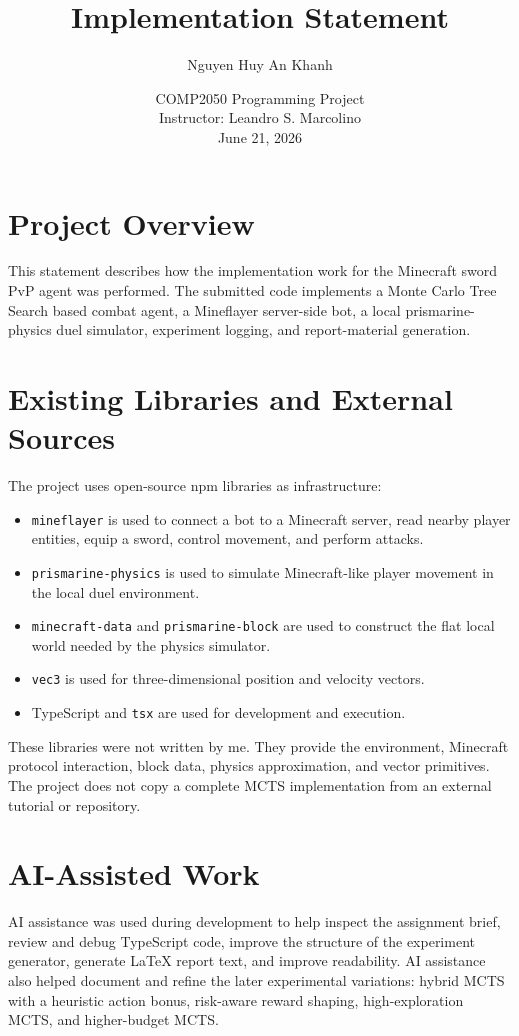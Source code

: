 \documentclass[11pt]{article}
\title{Implementation Statement}
\author{Nguyen Huy An Khanh}
\date{COMP2050 Programming Project\\Instructor: Leandro S. Marcolino\\June 21, 2026}
\begin{document}
\maketitle

\section*{Project Overview}

This statement describes how the implementation work for the Minecraft sword PvP agent was performed. The submitted code implements a Monte Carlo Tree Search based combat agent, a Mineflayer server-side bot, a local prismarine-physics duel simulator, experiment logging, and report-material generation.

\section*{Existing Libraries and External Sources}

The project uses open-source npm libraries as infrastructure:
\begin{itemize}
  \item \texttt{mineflayer} is used to connect a bot to a Minecraft server, read nearby player entities, equip a sword, control movement, and perform attacks.
  \item \texttt{prismarine-physics} is used to simulate Minecraft-like player movement in the local duel environment.
  \item \texttt{minecraft-data} and \texttt{prismarine-block} are used to construct the flat local world needed by the physics simulator.
  \item \texttt{vec3} is used for three-dimensional position and velocity vectors.
  \item TypeScript and \texttt{tsx} are used for development and execution.
\end{itemize}

These libraries were not written by me. They provide the environment, Minecraft protocol interaction, block data, physics approximation, and vector primitives. The project does not copy a complete MCTS implementation from an external tutorial or repository.

\section*{AI-Assisted Work}

AI assistance was used during development to help inspect the assignment brief, review and debug TypeScript code, improve the structure of the experiment generator, generate LaTeX report text, and improve readability. AI assistance also helped document and refine the later experimental variations: hybrid MCTS with a heuristic action bonus, risk-aware reward shaping, high-exploration MCTS, and higher-budget MCTS.
\end{document}
